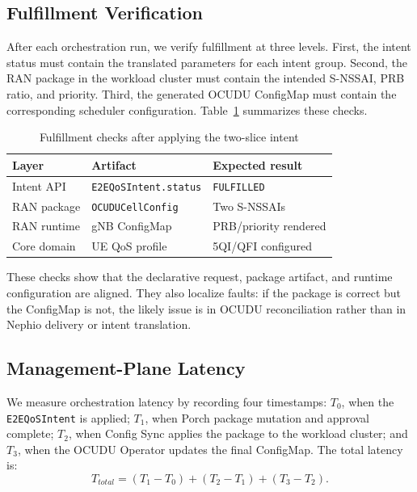 \subsection{Fulfillment Verification}

After each orchestration run, we verify fulfillment at three levels. First, the intent status must contain the translated parameters for each intent group. Second, the RAN package in the workload cluster must contain the intended S-NSSAI, PRB ratio, and priority. Third, the generated OCUDU ConfigMap must contain the corresponding scheduler configuration. Table~\ref{tab:verification} summarizes these checks.

\begin{table}[t]
  \caption{Fulfillment checks after applying the two-slice intent}
  \label{tab:verification}
  \begin{tabular}{lll}
    \toprule
    Layer & Artifact & Expected result \\
    \midrule
    Intent API & \texttt{E2EQoSIntent.status} & \texttt{FULFILLED} \\
    RAN package & \texttt{OCUDUCellConfig} & Two S-NSSAIs \\
    RAN runtime & gNB ConfigMap & PRB/priority rendered \\
    Core domain & UE QoS profile & 5QI/QFI configured \\
    \bottomrule
  \end{tabular}
\end{table}

These checks show that the declarative request, package artifact, and runtime configuration are aligned. They also localize faults: if the package is correct but the ConfigMap is not, the likely issue is in OCUDU reconciliation rather than in Nephio delivery or intent translation.

\subsection{Management-Plane Latency}

We measure orchestration latency by recording four timestamps: $T_0$, when the \texttt{E2EQoSIntent} is applied; $T_1$, when Porch package mutation and approval complete; $T_2$, when Config Sync applies the package to the workload cluster; and $T_3$, when the OCUDU Operator updates the final ConfigMap. The total latency is:
\begin{equation}
  T_{total} = (T_1 - T_0) + (T_2 - T_1) + (T_3 - T_2).
\end{equation}

